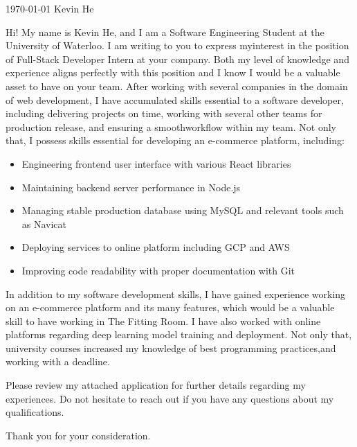 \documentclass[11pt, a4paper]{awesome-cv}
\begin{document}
\makecvheader[C]

\makecvfooter
  {\today}
  {Kevin He}
  {}

\makelettertitle

\begin{cvletter}


Hi! My name is Kevin He, and I am a Software Engineering Student at the University 
of Waterloo. I am writing to you to express myinterest in the position of Full-Stack 
Developer Intern at your company. Both my level of knowledge and experience aligns 
perfectly with this position and I know I would be a valuable asset to have on your team. 
After working with several companies in the domain of web development, I have accumulated skills essential 
to a software developer, including delivering projects on time, working with several other teams for production 
release, and ensuring a smoothworkflow within my team. Not only that, I possess skills essential for developing an e-commerce platform, including:

\begin{itemize}
  \item Engineering frontend user interface with various React libraries
  \item Maintaining backend server performance in Node.js
  \item Managing stable production database using MySQL and relevant tools such as Navicat
  \item Deploying services to online platform including GCP and AWS
  \item Improving code readability with proper documentation with Git
\end{itemize}

In addition to my software development skills, I have gained experience working on an e-commerce platform and its many 
features, which would be a valuable skill to have working in The Fitting Room. I have also worked with online platforms 
regarding deep learning model training and deployment. Not only that, university courses increased my knowledge of best 
programming practices,and working with a deadline.

Please review my attached application for further details regarding my experiences. Do not hesitate to reach out if you have any questions about my qualifications.

Thank you for your consideration.


\end{cvletter}


\makeletterclosing
\end{document}
